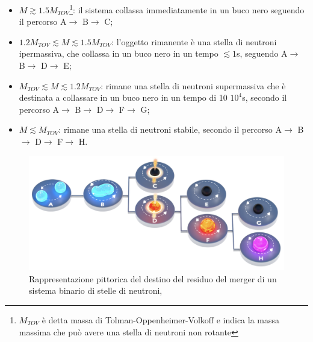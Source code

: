 \begin{itemize}
	\item $M\gtrsim 1.5 M_{TOV}$\footnote{$M_{TOV}$ è detta massa di Tolman-Oppenheimer-Volkoff e indica la massa massima che può avere una stella di neutroni non rotante}: il sistema collassa immediatamente in un buco nero seguendo il percorso A$\rightarrow$ B$\rightarrow$ C;
\end{itemize}

\begin{itemize}
	\item $1.2 M_{TOV} \lesssim M \lesssim 1.5 M_{TOV}$: l'oggetto rimanente è una stella di neutroni ipermassiva, che collassa in un buco nero in un tempo $\lesssim 1$s, seguendo A$\rightarrow$ B$\rightarrow$ D$\rightarrow$ E;		
	\item $M_{TOV} \lesssim M \lesssim 1.2 M_{TOV}$: rimane una stella di neutroni supermassiva che è destinata a collassare in un buco nero in un tempo di 10 \textdiv $10^4$s, secondo il percorso A$\rightarrow$ B$\rightarrow$ D$\rightarrow$ F$\rightarrow$ G;		\item $M\lesssim M_{TOV}$: rimane una stella di neutroni stabile, secondo il percorso A$\rightarrow$ B$\rightarrow$ D$\rightarrow$ F$\rightarrow$ H.	
\end{itemize}

\vspace{-15pt}
\begin{figure}
	\includegraphics[scale=0.2]{figures/Capitolo_1/MagnetarEvolution.png}
	\captionsetup{width=0.8\textwidth}
	\caption{Rappresentazione pittorica del destino del residuo del merger di un sistema binario di stelle di neutroni, \cite{sarin2020evolution}}
	\label{fig:EvoluzioneBNS}
	\vspace{-15pt}
\end{figure}

